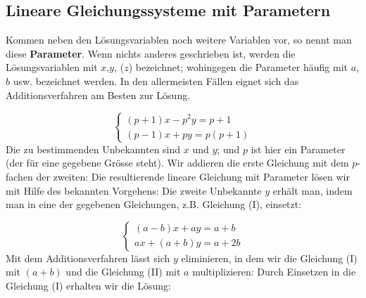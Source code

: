 \documentclass[11pt,oneside]{article}
\begin{document}
\subsection{Lineare Gleichungssysteme mit Parametern}
	Kommen neben den Lösungsvariablen noch weitere Variablen vor, so nennt man diese \textbf{Parameter}. Wenn nichts anderes geschrieben ist, werden die Lösungsvariablen mit $x$,$y$, ($z$) bezeichnet; wohingegen die Parameter häufig mit $a$, $b$ usw. bezeichnet werden.\vspace{11pt}\newline
	In den allermeisten Fällen eignet sich das Additionsverfahren am Besten zur Lösung.
	\begin{beispiel}
		\[\left\{
		\begin{matrix}
			(p+1)x-p^2y=p+1\\
			(p-1)x+py=p(p+1)
		\end{matrix}\right.\]
		Die zu bestimmenden Unbekannten sind $x$ und $y$; und $p$ ist hier ein Parameter (der für eine gegebene Grösse steht). Wir addieren die erste Gleichung mit dem $p$-fachen der zweiten:\vspace*{5pt}\newline{}
		Die resultierende lineare Gleichung mit Parameter lösen wir mit Hilfe des bekannten Vorgehens: \vspace*{5pt}\newline{}
		Die zweite Unbekannte $y$ erhält man, indem man  in eine der gegebenen Gleichungen, z.B. Gleichung (I), einsetzt:\vspace*{5pt}\newline{}
	\end{beispiel}
	\begin{beispiel}
		\[\left\{
		\begin{matrix}
			(a-b)x+ay=a+b\\
			ax+(a+b)y=a+2b
		\end{matrix}\right.\]
		Mit dem Additionsverfahren lässt sich $y$ eliminieren, in dem wir die Gleichung (I) mit $(a+b)$ und die Gleichung (II) mit $a$ multiplizieren:\vspace*{5pt}\newline\karos{6.5}
		Durch Einsetzen in die Gleichung (I) erhalten wir die Lösung: \vspace*{5pt}\newline\karos{6.5}
	\end{beispiel}
\end{document}
